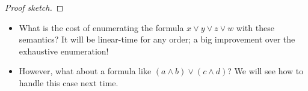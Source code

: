 \documentclass{tufte-handout}
\begin{document}
\begin{proof}[Proof sketch]



\end{proof}



\begin{itemize}
  \item What is the cost of enumerating the formula $x \lor y \lor z \lor w$ with these 
  semantics? It will be linear-time for any order; a big improvement over the 
  exhaustive enumeration!

  \item However, what about a formula like $(a \land b) \lor (c \land d)$? We will see how to 
  handle this case next time.
\end{itemize}


\end{document}
